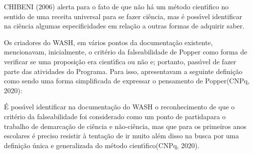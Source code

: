 \documentclass[
12pt,		%
openright,	%
twoside,  %
a4paper,			%
chapter=TITLE,		%
english,			%
french,				%
spanish,			%
brazil				%
]{USPSC-classe/USPSC}
\begin{document}
 CHIBENI (2006) alerta para o fato de que \textquotedbl n\~ao h\'a um m\'etodo cient\'{\i}fico no sentido de uma receita universal para se fazer ci\^encia\textquotedbl , mas \'e poss\'{\i}vel identificar na ci\^encia algumas especificidades em rela\c{c}\~ao a outras formas de adquirir saber.

















Os criadores do WASH, em v\'arios pontos da documenta\c{c}\~ao existente, mencionavam, inicialmente, o crit\'erio da falseabilidade de Popper como forma de verificar se uma proposi\c{c}\~ao era cient\'{\i}fica ou n\~ao e; portanto, pass\'{\i}vel de fazer parte das atividades do Programa. Para isso, apresentavam a seguinte defini\c{c}\~ao como sendo uma \textquotedbl forma simplificada de expressar o pensamento de Popper\textquotedbl   (CNPq, 2020):


















\noindent\begin{center}\mbox{\centering{}}\end{center}


\'E poss\'{\i}vel identificar na documenta\c{c}\~ao do WASH o reconhecimento de que o crit\'erio da falseabilidade foi considerado como um \textquotedbl ponto de partida\textquotedbl  para o trabalho de \textquotedbl demarca\c{c}\~ao de ci\^encia e n\~ao-ci\^encia\textquotedbl , mas que para \textquotedbl os primeiros anos escolares \'e preciso resistir \`a tenta\c{c}\~ao de ir muito al\'em disso na busca por uma defini\c{c}\~ao \'unica e generalizada do m\'etodo cient\'{\i}fico\textquotedbl   (CNPq, 2020).
\end{document}

